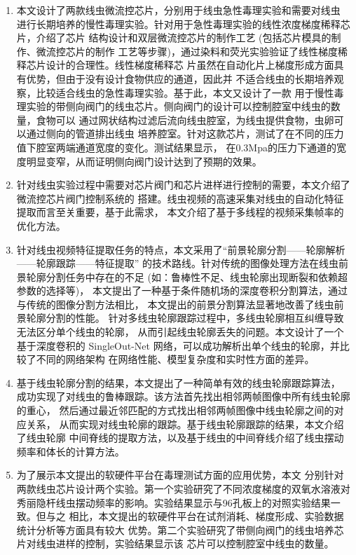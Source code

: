 	\begin{enumerate}[label={(\arabic*)},font={\color{black!50!black}\bfseries}]
	\item 本文设计了两款线虫微流控芯片，分别用于线虫急性毒理实验和需要对线虫
	进行长期培养的慢性毒理实验。针对用于急性毒理实验的线性浓度梯度稀释芯片，介绍了芯片
	结构设计和双层微流控芯片的制作工艺 (包括芯片模具的制作、微流控芯片的制作
	工艺等步骤)，通过染料和荧光实验验证了线性梯度稀释芯片设计的合理性。线性梯度稀释芯
	片虽然在自动化片上梯度形成方面具有优势，但由于没有设计食物供应的通道，因此并
	不适合线虫的长期培养观察，比较适合线虫的急性毒理实验。基于此，本文又设计了一款
	用于慢性毒理实验的带侧向阀门的线虫芯片。侧向阀门的设计可以控制腔室中线虫的数量，食物可以
	通过网状结构过滤后流向线虫腔室，为线虫提供食物，虫卵可以通过侧向的管道排出线虫
	培养腔室。针对这款芯片，测试了在不同的压力值下腔室两端通道宽度的变化。测试结果显示，
	在0.3Mpa的压力下通道的宽度明显变窄，从而证明侧向阀门设计达到了预期的效果。
	\item 针对线虫实验过程中需要对芯片阀门和芯片进样进行控制的需要，本文介绍了微流控芯片阀门控制系统的
	搭建。线虫视频的高速采集对线虫的自动化特征提取而言至关重要，基于此需求，
	本文介绍了基于多线程的视频采集帧率的优化方法。

	\item 针对线虫视频特征提取任务的特点，本文采用了“前景轮廓分割——轮廓解析——轮廓跟踪——特征提取”
	的技术路线。针对传统的图像处理方法在线虫前景轮廓分割任务中存在的不足 
	(如：鲁棒性不足、线虫轮廓出现断裂和依赖超参数的选择等)，
	本文提出了一种基于条件随机场的深度卷积分割算法，通过与传统的图像分割方法相比，
	本文提出的前景分割算法显著地改善了线虫前景轮廓分割的性能。
	针对多线虫轮廓跟踪过程中，多线虫轮廓相互纠缠导致无法区分单个线虫的轮廓，
	从而引起线虫轮廓丢失的问题。本文设计了一个基于深度卷积的 
	SingleOut-Net 网络，可以成功解析出单个线虫的轮廓，并比较了不同的网络架构
	在网络性能、模型复杂度和实时性方面的差异。

	\item 基于线虫轮廓分割的结果，本文提出了一种简单有效的线虫轮廓跟踪算法，
	成功实现了对线虫的鲁棒跟踪。该方法首先找出相邻两帧图像中所有线虫轮廓的重心，
	然后通过最近邻匹配的方式找出相邻两帧图像中线虫轮廓之间的对应关系，
	从而实现对线虫轮廓的跟踪。基于线虫轮廓跟踪的结果，本文介绍了线虫轮廓
	中间脊线的提取方法，以及基于线虫的中间脊线介绍了线虫摆动频率和体长的计算方法。
	
	\item 为了展示本文提出的软硬件平台在毒理测试方面的应用优势，本文
	分别针对两款线虫芯片设计两个实验。第一个实验研究了不同浓度梯度的双氧水溶液对
	秀丽隐杆线虫摆动频率的影响。实验结果显示与96孔板上的对照实验结果一致。但与之
	相比，本文提出的软硬件平台在试剂消耗、梯度形成、实验数据统计分析等方面具有较大
	优势。第二个实验研究了带侧向阀门的线虫培养芯片对线虫进样的控制，实验结果显示该
	芯片可以控制腔室中线虫的数量。
	\end{enumerate}
	
